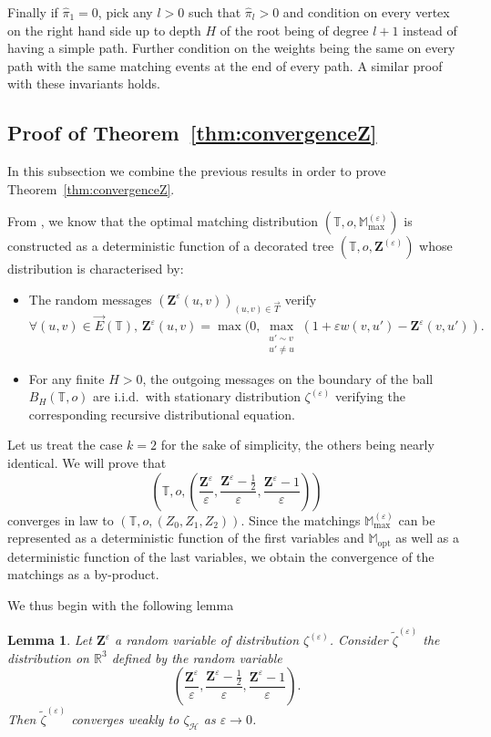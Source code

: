 \documentclass[11pt]{article}
\newtheorem{lemma}[prop]{Lemma}
\newcommand{\eps}{\varepsilon}
\begin{document}
\bigskip

Finally if $\hat{\pi}_1=0$, pick any $l>0$ such that $\hat{\pi}_l>0$ and condition on every vertex on the right hand side up to depth $H$ of the root being of degree $l+1$ instead of having a simple path. Further condition on the weights being the same on every path with the same matching events at the end of every path. A similar proof with these invariants holds.
\subsection{Proof of Theorem~\ref{thm:convergenceZ}}
In this subsection we combine the previous results in order to prove Theorem~\ref{thm:convergenceZ}.

From \cite[Theorem 1]{enriquez2024optimalunimodularmatching}, we know that the optimal matching distribution $(\mathbb{T},o,\mathbb{M}_{\max}^{(\eps)})$ is constructed as a deterministic function of a decorated tree $(\mathbb{T},o,\mathbf{Z}^{(\eps)})$ whose distribution is characterised by:
\begin{itemize}
    \item The random messages $(\mathbf{Z}^{\eps}(u,v))_{(u,v) \in \overset{\rightarrow}{T}}$ verify
    \begin{equation}
        \forall (u,v) \in \overset{\rightarrow}{E}(\mathbb{T}), \, \mathbf{Z}^{\eps} (u,v)= \max(0, \max_{\substack{u' \sim v \\ u' \neq u}} (1+\eps w(v,u')-\mathbf{Z}^{\eps}(v,u')).
    \end{equation}
    \item For any finite $H>0$, the outgoing messages on the boundary of the ball $B_H(\mathbb{T},o)$ are i.i.d.~with stationary distribution $\zeta^{(\eps)}$ verifying the corresponding recursive distributional equation.
\end{itemize}
Let us treat the case $k=2$ for the sake of simplicity, the others being nearly identical.
We will prove that \[\left(\mathbb{T},o, \left(\frac{\mathbf{Z}^{\eps}}{\eps},\frac{\mathbf{Z}^{\eps}-\frac{1}{2}}{\eps},\frac{\mathbf{Z}^{\eps}-1}{\eps} \right) \right)\] converges in law to $(\mathbb{T},o, (Z_0,Z_1,Z_2))$. Since the matchings $\mathbb{M}_{\max}^{(\eps)}$
 can be represented as a deterministic function of the first variables and $\mathbb{M}_{\mathrm{opt}}$ as well as a deterministic function of the last variables, we obtain the convergence of the matchings as a by-product.

 We thus begin with the following lemma
\begin{lemma}\label{lem:Zconvergerenorm}
    Let $\mathbf{Z}^{\eps}$ a random variable of distribution $\zeta^{(\eps)}$.
    Consider $\tilde{\zeta}^{(\eps)}$  the distribution on $\mathbb{R}^3$ defined by the random variable \[\left(\frac{\mathbf{Z}^{\eps}}{\eps},\frac{\mathbf{Z}^{\eps}-\frac{1}{2}}{\eps},\frac{\mathbf{Z}^{\eps}-1}{\eps} \right) .\]
    Then $\tilde{\zeta}^{(\eps)}$ converges weakly to $\zeta_{\mathcal{H}}$ as $\eps \to 0$.
\end{lemma}
\end{document}
